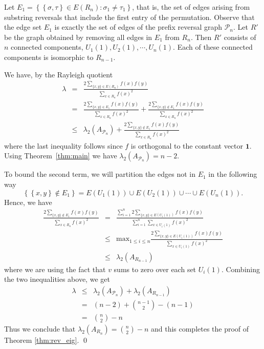  
 Let $E_1 = \left\{ \left\{\sigma, \tau\right\} \in E(R_n) : \sigma_1 \neq \tau_1 \right\}$,
 that is, the set of edges arising from substring reversals that include 
 the first entry of the permutation.  Observe that the edge set $E_1$
 is exactly the set of edges of the prefix reversal graph $\mathcal{P}_n$.
 Let $R'$ be the graph obtained by removing all edges in $E_1$ from $R_n$.  Then
 $R'$ consists of $n$ connected components, $U_1(1), U_2(1), \cdots, U_n(1)$.
 Each of these connected components is isomorphic to $R_{n-1}$.  
 
 
We have, by the Rayleigh quotient
  \begin{eqnarray*}
   \lambda & = &  \frac{2\sum_{\{x,y\} \in E(R_n)} f(x) f(y)}{\sum_{x \in R_n} f(x)^2}\\
   & = & \frac{2\sum_{\{x,y\} \in E_1} f(x) f(y)}{\sum_{x \in R_n} f(x)^2} + \frac{2\sum_{\{x,y\} \not \in E_1} f(x)f(y)}{\sum_{x \in R_n} f(x)^2}\\
   & \leq & \lambda_2(A_{\mathcal{P}_n}) + \frac{2\sum_{\{x,y\} \not \in E_1} f(x) f(y)}{\sum_{x \in R_n} f(x)^2}
   \end{eqnarray*}
 where the last inequality follows since $f$ is orthogonal to the constant
 vector $\textbf{1}$.  Using Theorem~\ref{thm:main} we have 
 $\lambda_2(A_{\mathcal{P}_n}) = n-2$.
 
 
 To bound the second term, we will partition the edges not in $E_1$ in the following way
  \[ \left\{ \left\{ x,y \right\} \not \in E_1 \right\} = E(U_1(1)) \cup E(U_2(1)) \cup \cdots \cup E(U_n(1)) . \]
 Hence, we have 
  \begin{eqnarray*}
   \frac{2\sum_{\{x,y\} \not \in E_1} f(x) f(y)}{\sum_{x \in R_n} f(x)^2} & = & 
   \frac{\sum_{i=1}^n 2\sum_{\{x,y\} \in E(U_i(1))} f(x) f(y)}{\sum_{i=1}^n \sum_{x \in U_i(1)} f(x)^2} \\
   & \leq & \text{max}_{1 \leq i \leq n}  \frac{2\sum_{\{x,y\} \in E(U_i(1))} f(x) f(y)}{\sum_{x \in U_i(1)} f(x)^2} \\
   & \leq & \lambda_2(A_{R_{n-1}}) 
  \end{eqnarray*}
 where we are using the fact that $v$ sums to zero over each set $U_i(1)$.
 Combining the two inequalities above, we get 
  \begin{eqnarray*}
  \lambda & \leq & \lambda_2(A_{\mathcal{P}_n}) + \lambda_2(A_{R_{n-1}}) \\
  & = & (n-2) + \binom{n-1}{2} - (n-1) \\
  & = & \binom{n}{2} - n
  \end{eqnarray*}
  Thus we conclude that $\lambda_2(A_{R_n}) = \binom n 2 -n$ and this completes the proof of Theorem \ref{thm:rev_eig}.
\qed



